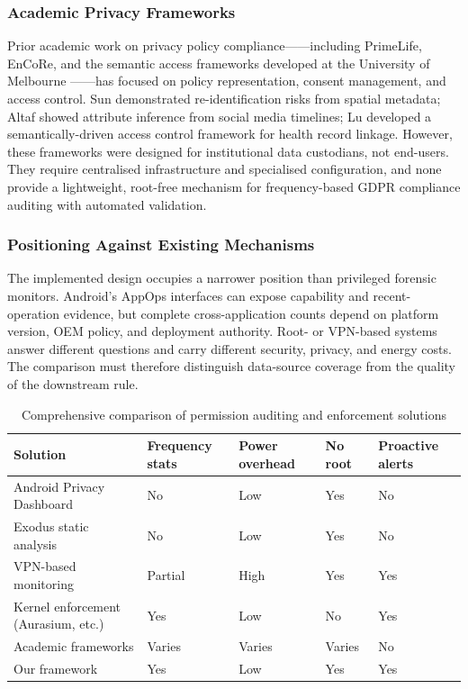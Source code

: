 \subsubsection{Academic Privacy Frameworks}

Prior academic work on privacy policy compliance——including PrimeLife, EnCoRe, and the semantic access frameworks developed at the University of Melbourne \cite{15,16,17}——has focused on policy representation, consent management, and access control. Sun \cite{15} demonstrated re-identification risks from spatial metadata; Altaf \cite{16} showed attribute inference from social media timelines; Lu \cite{17} developed a semantically-driven access control framework for health record linkage. However, these frameworks were designed for institutional data custodians, not end-users. They require centralised infrastructure and specialised configuration, and none provide a lightweight, root-free mechanism for frequency-based GDPR compliance auditing with automated validation.

\subsubsection{Positioning Against Existing Mechanisms}

The implemented design occupies a narrower position than privileged forensic monitors. Android's AppOps interfaces can expose capability and recent-operation evidence, but complete cross-application counts depend on platform version, OEM policy, and deployment authority. Root- or VPN-based systems answer different questions and carry different security, privacy, and energy costs. The comparison must therefore distinguish data-source coverage from the quality of the downstream rule.

\begin{table}[H]
\centering
\caption{Comprehensive comparison of permission auditing and enforcement solutions}
\begin{tabular}{p{2.8cm}p{2.2cm}p{2.2cm}p{2.2cm}p{2.2cm}}
\toprule
\textbf{Solution} & \textbf{Frequency stats} & \textbf{Power overhead} & \textbf{No root} & \textbf{Proactive alerts} \\
\midrule
Android Privacy Dashboard & No & Low & Yes & No \\
Exodus static analysis & No & Low & Yes & No \\
VPN-based monitoring & Partial & High & Yes & Yes \\
Kernel enforcement (Aurasium, etc.) & Yes & Low & No & Yes \\
Academic frameworks & Varies & Varies & Varies & No \\
Our framework & Yes & Low & Yes & Yes \\
\bottomrule
\end{tabular}
\end{table}

